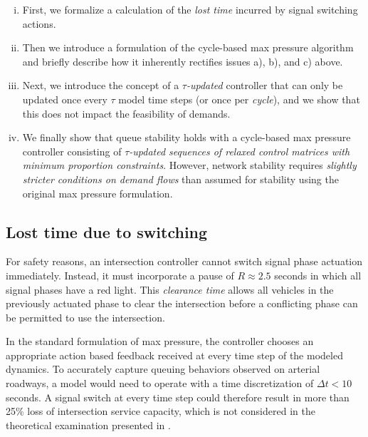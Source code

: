 \begin{enumerate}[i.]
\item First, we formalize a calculation of the \emph{lost time} incurred by signal switching actions. 
\item Then we introduce a formulation of the cycle-based max pressure algorithm and briefly describe how it inherently rectifies issues a), b), and c) above. 
\item Next, we introduce the concept of a \emph{$\tau$-updated} controller that can only be updated once every $\tau$ model time steps (or once per \emph{cycle}), and we show that this does not impact the feasibility of demands.  
\item We finally show that queue stability holds with a cycle-based max pressure controller consisting of \emph{$\tau$-updated sequences of relaxed control matrices with minimum proportion constraints}. However, network stability requires \emph{slightly stricter conditions on demand flows} than assumed for stability using the original max pressure formulation.
\end{enumerate}

%



 
\subsection*{Lost time due to switching}
For safety reasons, an intersection controller cannot switch signal phase actuation immediately. Instead, it must incorporate a pause of $R\approx2.5$ seconds in which all signal phases have a red light. This \emph{clearance time} allows all vehicles in the previously actuated phase to clear the intersection before a conflicting phase can be permitted to use the intersection. 

In the standard formulation of max pressure, the controller chooses an appropriate action based feedback received at every time step of the modeled dynamics. To accurately capture queuing behaviors observed on arterial roadways, a model would need to operate with a time discretization of $\Delta t< 10$ seconds. A signal switch at every time step could therefore result in more than 25\% loss of intersection service capacity, which is not considered in the theoretical examination presented in \cite{MaxPressureStochastic}. 

